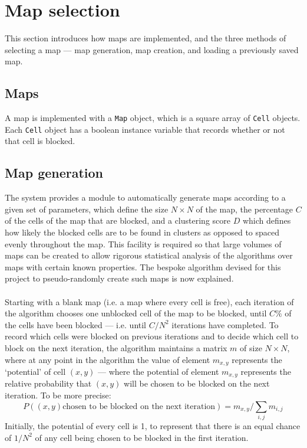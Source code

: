 \documentclass[12pt,notitlepage]{report}
\begin{document}
\section{Map selection}

This section introduces how maps are implemented, and the three methods of selecting a map --- map generation, map creation, and loading a previously saved map.\\

\subsection{Maps}
A map is implemented with a {\tt Map} object, which is a square array of {\tt Cell} objects. Each {\tt Cell} object has a boolean instance variable that records whether or not that cell is blocked.

\subsection{Map generation}
The system provides a module to automatically generate maps according to a given set of parameters, which define the size $N \times N$ of the map, the percentage $C$ of the cells of the map that are blocked, and a clustering score $D$ which defines how likely the blocked cells are to be found in clusters as opposed to spaced evenly throughout the map. This facility is required so that large volumes of maps can be created to allow rigorous statistical analysis of the algorithms over maps with certain known properties. The bespoke algorithm devised for this project to pseudo-randomly create such maps is now explained.\\

\\
\noindent
Starting with a blank map (i.e. a map where every cell is free), each iteration of the algorithm chooses one unblocked cell of the map to be blocked, until $C\%$ of the cells have been blocked --- i.e. until $C/N^{2}$ iterations have completed. To record which cells were blocked on previous iterations and to decide which cell to block on the next iteration, the algorithm maintains a matrix $m$ of size $N \times N$, where at any point in the algorithm the value of element $m_{x,y}$ represents the `potential' of cell $(x,y)$ --- where the potential of element $m_{x,y}$ represents the relative probability that $(x,y)$ will be chosen to be blocked on the next iteration. To be more precise: 
\begin{equation}
P((x,y) \mbox{chosen to be blocked on the next iteration}) = m_{x,y}/\sum\limits_{i,j} m_{i,j}
\end{equation}
\noindent
Initially, the potential of every cell is 1, to represent that there is an equal chance of $1/N^{2}$ of any cell being chosen to be blocked in the first iteration.\\
\end{document}
